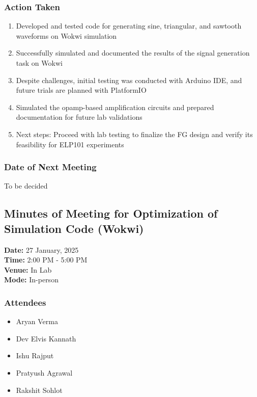 \documentclass[12pt,a4paper]{article}
\begin{document}
\subsubsection*{Action Taken}
\begin{enumerate}
    \item Developed and tested code for generating sine, triangular, and sawtooth waveforms on Wokwi simulation
    \item Successfully simulated and documented the results of the signal generation task on Wokwi
    \item Despite challenges, initial testing was conducted with Arduino IDE, and future trials are planned with PlatformIO
    \item Simulated the opamp-based amplification circuits and prepared documentation for future lab validations
    \item Next steps: Proceed with lab testing to finalize the FG design and verify its feasibility for ELP101 experiments
\end{enumerate}



\subsubsection*{Date of Next Meeting}
To be decided


\subsection*{Minutes of Meeting for Optimization of Simulation Code (Wokwi)}
\noindent
\textbf{Date:} 27 January, 2025 \\
\textbf{Time:} 2:00 PM - 5:00 PM \\
\textbf{Venue:} In Lab \\
\textbf{Mode:} In-person \\

\subsubsection*{Attendees}
\begin{itemize}
    \item Aryan Verma
    \item Dev Elvis Kannath
    \item Ishu Rajput
    \item Pratyush Agrawal
    \item Rakshit Sohlot
    
\end{itemize}
\end{document}
